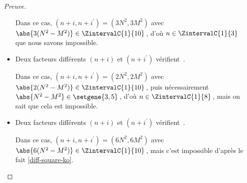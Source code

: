 \begin{proof}[Preuve]
\begin{itemize}
		\smallskip
		\noindent
		Dans ce cas, $(n+i, n+i^\prime) = (3 N^2, 3 M^2)$ avec $\abs{3(N^2 - M^2)} \in \ZintervalC{1}{10}$\,, d'où $n \in \ZintervalC{1}{3}$ que nous savons impossible.

    	\medskip
		\item Deux facteurs différents $(n+i)$ et $(n+i^\prime)$ vérifient \,.
		
		\smallskip
		\noindent
		Dans ce cas, $(n+i, n+i^\prime) = (2 N^2, 2 M^2)$ avec $\abs{2(N^2 - M^2)} \in \ZintervalC{1}{10}$\,, puis nécessairement $\abs{N^2 - M^2} \in \setgene{3, 5}$\,, d'où $n \in \ZintervalC{1}{8}$\,, mais on sait que cela est impossible.


    	\medskip
		\item Deux facteurs différents $(n+i)$ et $(n+i^\prime)$ vérifient \,.
		
		\smallskip
		\noindent
		Dans ce cas, $(n+i, n+i^\prime) = (6 N^2, 6 M^2)$ avec $\abs{6(N^2 - M^2)} \in \ZintervalC{1}{10}$\,, mais c'est impossible d'après le fait \ref{diff-square-ko}.
    \end{itemize}
\end{proof}

